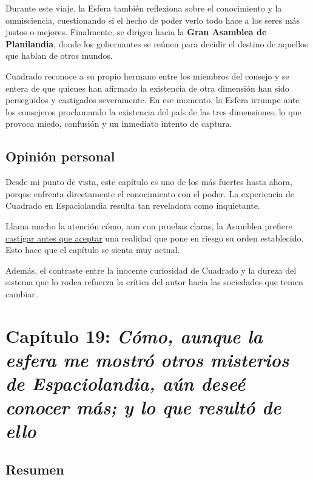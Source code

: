 \documentclass{article}
\begin{document}
Durante este viaje, la Esfera también reflexiona sobre el conocimiento y la omnisciencia, cuestionando si el hecho de poder verlo todo hace a los seres más justos o mejores. Finalmente, se dirigen hacia la \textbf{Gran Asamblea de Planilandia}, donde los gobernantes se reúnen para decidir el destino de aquellos que hablan de otros mundos.

Cuadrado reconoce a su propio hermano entre los miembros del consejo y se entera de que quienes han afirmado la existencia de otra dimensión han sido perseguidos y castigados severamente. En ese momento, la Esfera irrumpe ante los consejeros proclamando la existencia del país de las tres dimensiones, lo que provoca miedo, confusión y un inmediato intento de captura.

\subsection*{Opinión personal}

Desde mi punto de vista, este capítulo es uno de los más fuertes hasta ahora, porque enfrenta directamente el conocimiento con el poder. La experiencia de Cuadrado en Espaciolandia resulta tan reveladora como inquietante.

Llama mucho la atención cómo, aun con pruebas claras, la Asamblea prefiere \underline{castigar antes que aceptar} una realidad que pone en riesgo su orden establecido. Esto hace que el capítulo se sienta muy actual.

Además, el contraste entre la inocente curiosidad de Cuadrado y la dureza del sistema que lo rodea refuerza la crítica del autor hacia las sociedades que temen cambiar.

\section*{\textcolor{Cerulean}{Capítulo 19: \emph{Cómo, aunque la esfera me mostró otros misterios de Espaciolandia, aún deseé conocer más; y lo que resultó de ello}}}

\subsection*{Resumen}
\end{document}
